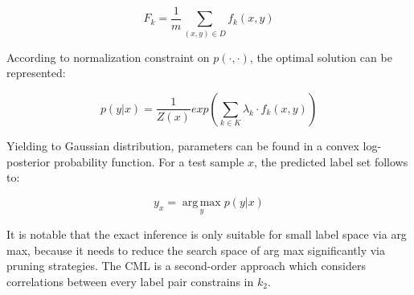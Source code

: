\begin{equation}\label{eq:CMLExpect}
F_{k} = \frac{1}{m}\sum_{(x,y) \in D}f_{k}(x,y)
\end{equation}

According to normalization constraint on $p(\cdot,\cdot)$, the optimal solution can be represented:

\begin{equation}\label{eq:CMLOptimal}
p(y|x) = \frac{1}{Z(x)}exp(\sum_{k \in K}\lambda_{k} \cdot f_{k}(x,y))
\end{equation}

Yielding to Gaussian distribution, parameters can be found in a convex log-posterior probability function. For a test sample $x$, the predicted label set follows to:

\begin{equation}\label{eq:CMLLabel}
y_{x} = \operatorname*{arg\,max}_{y} p(y|x)
\end{equation}

It is notable that the exact inference is only suitable for small label space via arg max, because it needs to reduce the search space of arg max significantly via pruning strategies. The CML is a second-order approach which considers correlations between every label pair constrains in $k_{2}$. 